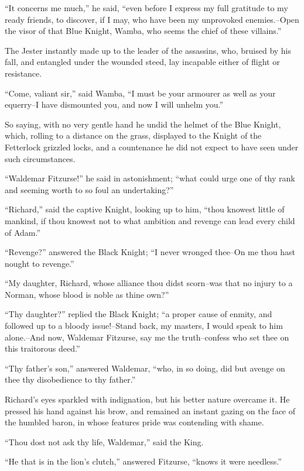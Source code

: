 ``It concerns me much,'' he said, ``even before I express my full
gratitude to my ready friends, to discover, if I may, who have been my
unprovoked enemies.--Open the visor of that Blue Knight, Wamba, who
seems the chief of these villains.''

The Jester instantly made up to the leader of the assassins, who,
bruised by his fall, and entangled under the wounded steed, lay
incapable either of flight or resistance.

``Come, valiant sir,'' said Wamba, ``I must be your armourer as well as
your equerry--I have dismounted you, and now I will unhelm you.''

So saying, with no very gentle hand he undid the helmet of the Blue
Knight, which, rolling to a distance on the grass, displayed to the
Knight of the Fetterlock grizzled locks, and a countenance he did not
expect to have seen under such circumstances.

``Waldemar Fitzurse!'' he said in astonishment; ``what could urge one of
thy rank and seeming worth to so foul an undertaking?''

``Richard,'' said the captive Knight, looking up to him, ``thou knowest
little of mankind, if thou knowest not to what ambition and revenge can
lead every child of Adam.''

``Revenge?'' answered the Black Knight; ``I never wronged thee--On me
thou hast nought to revenge.''

``My daughter, Richard, whose alliance thou didst scorn--was that no
injury to a Norman, whose blood is noble as thine own?''

``Thy daughter?'' replied the Black Knight; ``a proper cause of enmity,
and followed up to a bloody issue!--Stand back, my masters, I would
speak to him alone.--And now, Waldemar Fitzurse, say me the
truth--confess who set thee on this traitorous deed.''

``Thy father's son,'' answered Waldemar, ``who, in so doing, did but
avenge on thee thy disobedience to thy father.''

Richard's eyes sparkled with indignation, but his better nature overcame
it. He pressed his hand against his brow, and remained an instant gazing
on the face of the humbled baron, in whose features pride was contending
with shame.

``Thou dost not ask thy life, Waldemar,'' said the King.

``He that is in the lion's clutch,'' answered Fitzurse, ``knows it were
needless.''


